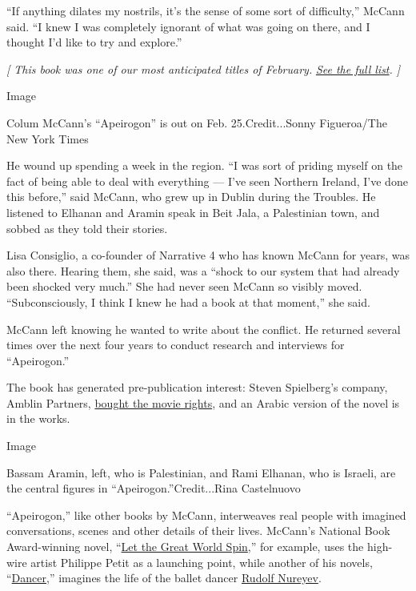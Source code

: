 ``If anything dilates my nostrils, it's the sense of some sort of
difficulty,'' McCann said. ``I knew I was completely ignorant of what
was going on there, and I thought I'd like to try and explore.''

\emph{{[} This book was one of our most anticipated titles of February.}
\href{https://www.nytimes.com/2020/01/29/books/new-february-books.html}{\emph{See
the full list}}\emph{. {]}}

Image

Colum McCann's ``Apeirogon'' is out on Feb. 25.Credit...Sonny
Figueroa/The New York Times

He wound up spending a week in the region. ``I was sort of priding
myself on the fact of being able to deal with everything --- I've seen
Northern Ireland, I've done this before,'' said McCann, who grew up in
Dublin during the Troubles. He listened to Elhanan and Aramin speak in
Beit Jala, a Palestinian town, and sobbed as they told their stories.

Lisa Consiglio, a co-founder of Narrative 4 who has known McCann for
years, was also there. Hearing them, she said, was a ``shock to our
system that had already been shocked very much.'' She had never seen
McCann so visibly moved. ``Subconsciously, I think I knew he had a book
at that moment,'' she said.

McCann left knowing he wanted to write about the conflict. He returned
several times over the next four years to conduct research and
interviews for ``Apeirogon.''

The book has generated pre-publication interest: Steven Spielberg's
company, Amblin Partners,
\href{https://www.hollywoodreporter.com/news/amblin-nabs-israeli-palestinian-friendship-novel-apeirogon-1278792}{bought
the movie rights}, and an Arabic version of the novel is in the works.

Image

Bassam Aramin, left, who is Palestinian, and Rami Elhanan, who is
Israeli, are the central figures in ``Apeirogon.''Credit...Rina
Castelnuovo

``Apeirogon,'' like other books by McCann, interweaves real people with
imagined conversations, scenes and other details of their lives.
McCann's National Book Award-winning novel,
``\href{https://www.nytimes.com/2009/08/02/books/review/Mahler-t.html}{Let
the Great World Spin},'' for example, uses the high-wire artist Philippe
Petit as a launching point, while another of his novels,
``\href{https://www.nytimes.com/2003/01/19/books/a-story-with-legs.html}{Dancer},''
imagines the life of the ballet dancer
\href{https://www.nytimes.com/1993/01/07/arts/rudolf-nureyev-charismatic-dancer-who-gave-fire-to-ballet-s-image-dies-at-54.html}{Rudolf
Nureyev}.

